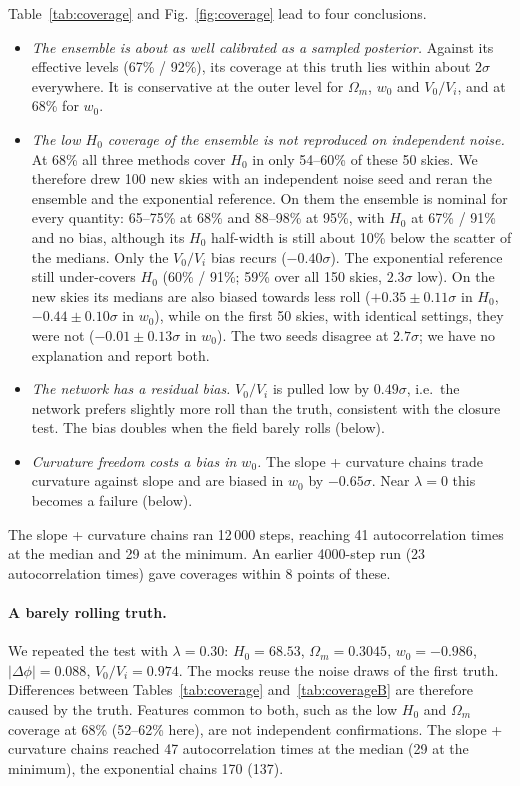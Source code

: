 \documentclass[11pt,a4paper]{article}
\begin{document}
Table~\ref{tab:coverage} and Fig.~\ref{fig:coverage} lead to four conclusions.
\begin{itemize}
\item \emph{The ensemble is about as well calibrated as a sampled posterior.} Against its effective levels (67\% / 92\%), its coverage at this truth lies within about $2\sigma$ everywhere. It is conservative at the outer level for $\Omega_m$, $w_0$ and $V_0/V_i$, and at 68\% for $w_0$.
\item \emph{The low $H_0$ coverage of the ensemble is not reproduced on independent noise.} At 68\% all three methods cover $H_0$ in only 54--60\% of these 50 skies. We therefore drew 100 new skies with an independent noise seed and reran the ensemble and the exponential reference. On them the ensemble is nominal for every quantity: 65--75\% at 68\% and 88--98\% at 95\%, with $H_0$ at 67\% / 91\% and no bias, although its $H_0$ half-width is still about 10\% below the scatter of the medians. Only the $V_0/V_i$ bias recurs ($-0.40\sigma$). The exponential reference still under-covers $H_0$ (60\% / 91\%; 59\% over all 150 skies, $2.3\sigma$ low). On the new skies its medians are also biased towards less roll ($+0.35\pm0.11\sigma$ in $H_0$, $-0.44\pm0.10\sigma$ in $w_0$), while on the first 50 skies, with identical settings, they were not ($-0.01\pm0.13\sigma$ in $w_0$). The two seeds disagree at $2.7\sigma$; we have no explanation and report both.
\item \emph{The network has a residual bias.} $V_0/V_i$ is pulled low by $0.49\sigma$, i.e.\ the network prefers slightly more roll than the truth, consistent with the closure test. The bias doubles when the field barely rolls (below).
\item \emph{Curvature freedom costs a bias in $w_0$.} The slope + curvature chains trade curvature against slope and are biased in $w_0$ by $-0.65\sigma$. Near $\lambda=0$ this becomes a failure (below).
\end{itemize}
The slope + curvature chains ran 12\,000 steps, reaching 41 autocorrelation times at the median and 29 at the minimum. An earlier 4000-step run (23 autocorrelation times) gave coverages within 8 points of these.

\paragraph{A barely rolling truth.} We repeated the test with $\lambda=0.30$: $H_0=68.53$, $\Omega_m=0.3045$, $w_0=-0.986$, $|\Delta\phi|=0.088$, $V_0/V_i=0.974$. The mocks reuse the noise draws of the first truth. Differences between Tables~\ref{tab:coverage} and~\ref{tab:coverageB} are therefore caused by the truth. Features common to both, such as the low $H_0$ and $\Omega_m$ coverage at 68\% (52--62\% here), are not independent confirmations. The slope + curvature chains reached 47 autocorrelation times at the median (29 at the minimum), the exponential chains 170 (137).
\end{document}
